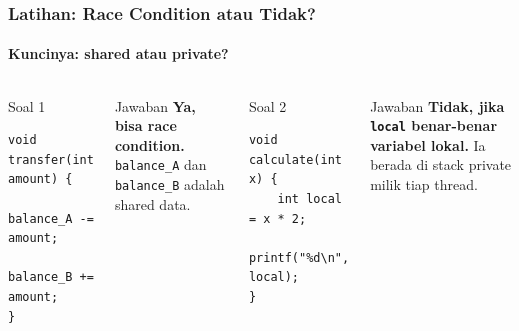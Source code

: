 \documentclass[t,aspectratio=169,xcolor=dvipsnames]{beamer}
\begin{document}
\begin{frame}[fragile]
    \frametitle{Latihan: Race Condition atau Tidak?}
    \framesubtitle{Kuncinya: shared atau private?}
    \scriptsize

    \begin{columns}[T]
        \begin{block}{Soal 1}
\begin{lstlisting}[basicstyle=\ttfamily\scriptsize, breaklines=true]
void transfer(int amount) {
    balance_A -= amount;
    balance_B += amount;
}
\end{lstlisting}
        \end{block}

        \begin{alertblock}{Jawaban}
            \textbf{Ya, bisa race condition.} \texttt{balance\_A} dan \texttt{balance\_B} adalah shared data.
        \end{alertblock}

        \begin{block}{Soal 2}
\begin{lstlisting}[basicstyle=\ttfamily\scriptsize, breaklines=true]
void calculate(int x) {
    int local = x * 2;
    printf("%d\n", local);
}
\end{lstlisting}
        \end{block}

        \begin{exampleblock}{Jawaban}
            \textbf{Tidak, jika \texttt{local} benar-benar variabel lokal.} Ia berada di stack private milik tiap thread.
        \end{exampleblock}
    \end{columns}
\end{frame}
\end{document}
